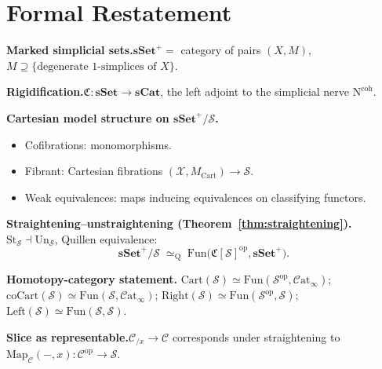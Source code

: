 \section*{Formal Restatement}

\begin{formalrestatement}
\textbf{Marked simplicial sets.}\quad $\mathbf{sSet}^+ = $ category of pairs
$(X, M)$, $M \supseteq \{\text{degenerate } 1\text{-simplices of } X\}$.

\medskip
\textbf{Rigidification.}\quad $\mathfrak{C} : \mathbf{sSet} \to \mathbf{sCat}$,
the left adjoint to the simplicial nerve $\mathrm{N}^{\mathrm{coh}}$.

\medskip
\textbf{Cartesian model structure on $\mathbf{sSet}^+\!/\mathcal{S}$.}\quad
\begin{itemize}
  \item Cofibrations: monomorphisms.
  \item Fibrant: Cartesian fibrations $(\mathcal{X}, M_{\mathrm{Cart}}) \to \mathcal{S}$.
  \item Weak equivalences: maps inducing equivalences on classifying functors.
\end{itemize}

\medskip
\textbf{Straightening--unstraightening (Theorem~\ref{thm:straightening}).}\quad
$\mathrm{St}_\mathcal{S} \dashv \mathrm{Un}_\mathcal{S}$, Quillen equivalence:
\begin{equation*}
  \mathbf{sSet}^+\!/\mathcal{S} \;\simeq_{\mathrm{Q}}\; \mathrm{Fun}\bigl(\mathfrak{C}[\mathcal{S}]^{\mathrm{op}}, \mathbf{sSet}^+\bigr).
\end{equation*}

\medskip
\textbf{Homotopy-category statement.}\quad
$\mathrm{Cart}(\mathcal{S}) \simeq \mathrm{Fun}(\mathcal{S}^{\mathrm{op}}, \mathcal{C}\mathrm{at}_\infty)$;
$\mathrm{coCart}(\mathcal{S}) \simeq \mathrm{Fun}(\mathcal{S}, \mathcal{C}\mathrm{at}_\infty)$;
$\mathrm{Right}(\mathcal{S}) \simeq \mathrm{Fun}(\mathcal{S}^{\mathrm{op}}, \mathcal{S})$;
$\mathrm{Left}(\mathcal{S}) \simeq \mathrm{Fun}(\mathcal{S}, \mathcal{S})$.

\medskip
\textbf{Slice as representable.}\quad $\mathcal{C}_{/x} \to \mathcal{C}$
corresponds under straightening to $\mathrm{Map}_\mathcal{C}(-, x) :
\mathcal{C}^{\mathrm{op}} \to \mathcal{S}$.
\end{formalrestatement}
